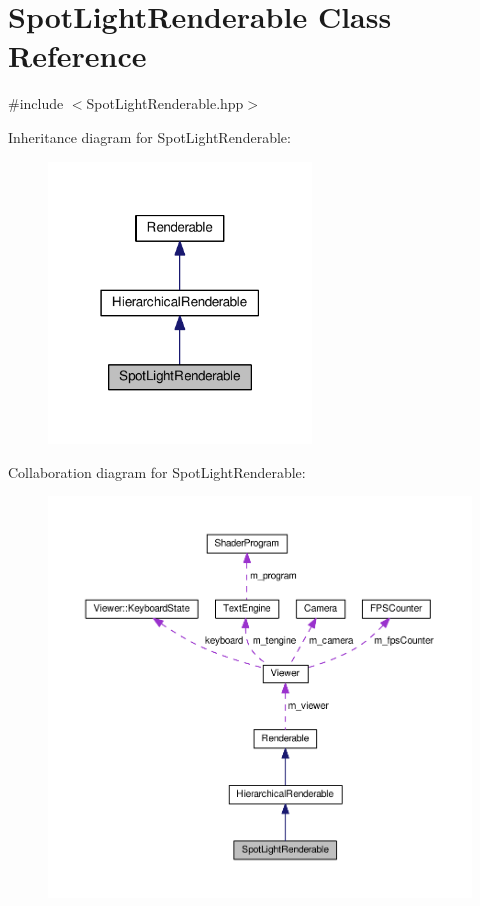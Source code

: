 \hypertarget{classSpotLightRenderable}{\section{Spot\+Light\+Renderable Class Reference}
\label{classSpotLightRenderable}
}


{\ttfamily \#include $<$Spot\+Light\+Renderable.\+hpp$>$}



Inheritance diagram for Spot\+Light\+Renderable\+:\nopagebreak
\begin{figure}[H]
\begin{center}
\leavevmode
\includegraphics[width=198pt]{classSpotLightRenderable__inherit__graph}
\end{center}
\end{figure}


Collaboration diagram for Spot\+Light\+Renderable\+:\nopagebreak
\begin{figure}[H]
\begin{center}
\leavevmode
\includegraphics[width=350pt]{classSpotLightRenderable__coll__graph}
\end{center}
\end{figure}
